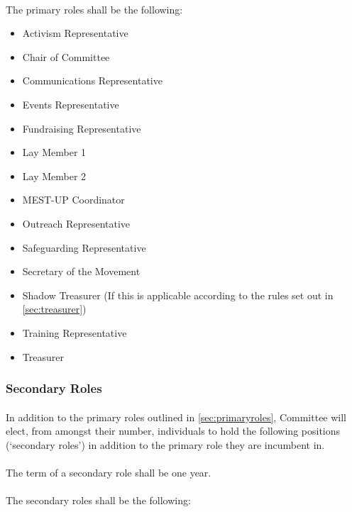 \documentclass[a4paper, 11pt]{report}
\begin{document}
\paragraph{} The primary roles shall be the following:

\begin{itemize}
\item Activism Representative
\item Chair of Committee
\item Communications Representative
\item Events Representative
\item Fundraising Representative
\item Lay Member 1
\item Lay Member 2
\item MEST-UP Coordinator
\item Outreach Representative
\item Safeguarding Representative
\item Secretary of the Movement
\item Shadow Treasurer (If this is applicable according to the rules set out in \autoref{sec:treasurer})
\item Training Representative
\item Treasurer
\end{itemize}

\subsubsection{Secondary Roles}
\label{sec:secondaryroles}

\paragraph{} In addition to the primary roles outlined in \ref{sec:primaryroles}, Committee will elect, from amongst their number, individuals to hold the following positions (`secondary roles') in addition to the primary role they are incumbent in.

\paragraph{} The term of a secondary role shall be one year.

\paragraph{} The secondary roles shall be the following:
\end{document}
